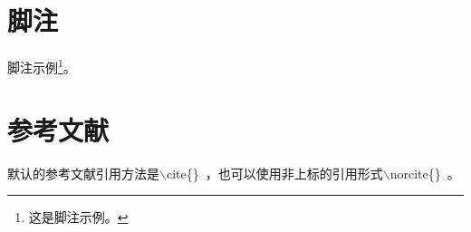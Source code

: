 
\section{脚注}

脚注示例\footnote{这是脚注示例。}。


\section{参考文献}

\par 默认的参考文献引用方法是$\backslash$cite\{\}~\cite{broder1997resemblance,broder1997syntactic}，也可以使用非上标的引用形式$\backslash$norcite\{\}~。
